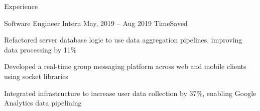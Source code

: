 \documentclass{resume} %
\begin{document}
\begin{rSection}{Experience}
		\begin{rWorkSection}
			{Software Engineer Intern}
			{May, 2019 -- Aug 2019}
			{TimeSaved}
			{}
			{
				\item Refactored server database logic to use data aggregation pipelines, improving data processing by 11{\%} 
				\item Developed a real-time group messaging platform across web and mobile clients using socket libraries
				\item Integrated infrastructure to increase user data collection by 37{\%}, enabling Google Analytics data pipelining
			}
		\end{rWorkSection}



	\end{rSection}
\end{document}
